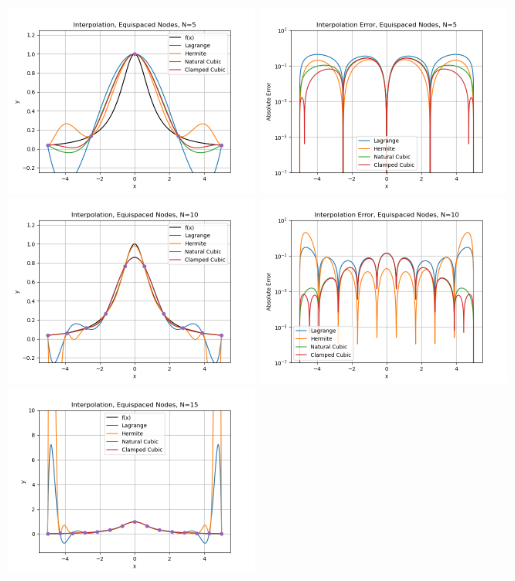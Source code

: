 \documentclass[10pt]{article}
\begin{document}
\begin{enumerate}
    \includegraphics[width=0.49\textwidth]{equi_N5_interp.png}
    \includegraphics[width=0.49\textwidth]{equi_N5_error.png}
    \includegraphics[width=0.49\textwidth]{equi_N10_interp.png}
    \includegraphics[width=0.49\textwidth]{equi_N10_error.png}
    \includegraphics[width=0.49\textwidth]{equi_N15_interp.png}

\end{enumerate}
\end{document}

